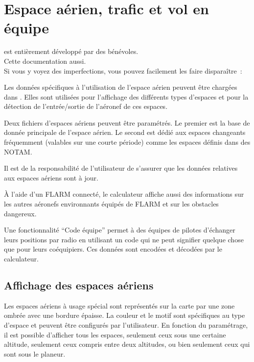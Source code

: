 
\chapter{Espace aérien, trafic et vol en équipe}\label{cha:airspace}

\begin{framed}
	\begin{center}
		\xc{} est entièrement développé par des bénévoles.\\
		Cette documentation aussi.\\
		Si vous y voyez des imperfections, vous pouvez facilement les faire disparaître~:\\
	\end{center}
\end{framed}

Les données spécifiques à l'utilisation de l'espace aérien peuvent être chargées dans \xc.
Elles sont utilisées pour l'affichage des différents types d'espaces et pour la détection de l'entrée/sortie de l'aéronef de ces espaces.

Deux fichiers d'espaces aériens peuvent être paramétrés. Le premier est la base de donnée principale de l'espace aérien.
Le second est dédié aux espaces changeants fréquemment (valables sur une courte période) comme les espaces définis dans des NOTAM.

Il est de la responsabilité de l'utilisateur de s'assurer que les données relatives aux espaces aériens sont à jour.

À l'aide d'un FLARM connecté, le calculateur affiche aussi des informations sur les autres aéronefs environnants équipés de FLARM et sur les obstacles dangereux.

Une fonctionnalité ``Code équipe'' permet à des équipes de pilotes d'échanger leurs positions par radio en utilisant un code qui ne peut signifier quelque chose que pour leurs coéquipiers. Ces données sont encodées et décodées par le calculateur.


\section{Affichage des espaces aériens}

Les espaces aériens à usage spécial sont représentés sur la carte par une zone ombrée avec une bordure épaisse.
La couleur et le motif sont spécifiques au type d'espace et peuvent être configurés par l'utilisateur.
En fonction du paramétrage, il est possible d'afficher tous les espaces, seulement ceux sous une certaine altitude, seulement ceux compris entre deux altitudes, ou bien seulement ceux qui sont sous le planeur.  

